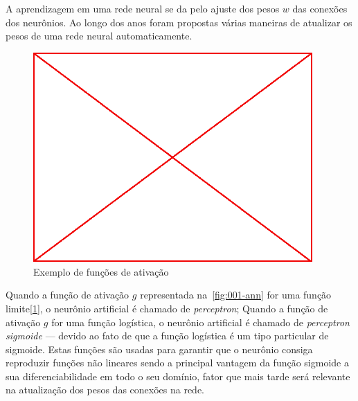 A aprendizagem em uma rede neural se da pelo ajuste dos pesos $w$ das conexões
dos neurônios. Ao longo dos anos foram propostas várias maneiras de atualizar
os pesos de uma rede neural automaticamente.

\begin{figure}
\label{fig:002-limit-functions}
  \caption{Exemplo de funções de ativação}
  \begin{center}
    \includegraphics[height=8cm]{placeholder}
  \end{center}
\end{figure}

Quando a função de ativação $g$ representada na~\ref{fig:001-ann} for uma
função limite[\ref{fig:002-limit-functions}], o neurônio artificial é chamado
de \emph{perceptron}; Quando a função de ativação $g$ for uma função logística,
o neurônio artificial é chamado de \emph{perceptron sigmoide} --- devido ao
fato de que a função logística é um tipo particular de sigmoide. Estas funções
são usadas para garantir que o neurônio consiga reproduzir funções não lineares
sendo a principal vantagem da função sigmoide a sua diferenciabilidade em todo
o seu domínio, fator que mais tarde será relevante na atualização dos pesos das
conexões na rede.
